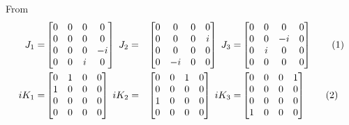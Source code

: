 \documentclass[]{article}
\newcommand\numberthis{\addtocounter{equation}{1}\tag{\theequation}}
\begin{document}
From \cite[II.3,(2,5,6)]{zee2010quantum}
\begin{align*}
	J_1 =& \begin{bmatrix}
		0&0&0&0\\
		0&0&0&0\\
		0&0&0&-i\\
		0&0&i&0\\
	\end{bmatrix}\;
	J_2 =& \begin{bmatrix}
		0&0&0&0\\
		0&0&0&i\\
		0&0&0&0\\
		0&-i&0&0\\
	\end{bmatrix}\;
	J_3 =& \begin{bmatrix}
		0&0&0&0\\
		0&0&-i&0\\
		0&i&0&0\\
		0&0&0&0\\
	\end{bmatrix} \numberthis \label{eq:Js}\\
	i K_1 =& \begin{bmatrix}
		0&1&0&0\\
		1&0&0&0\\
		0&0&0&0\\
		0&0&0&0\\
	\end{bmatrix}\;
	i K_2 =& \begin{bmatrix}
		0&0&1&0\\
		0&0&0&0\\
		1&0&0&0\\
		0&0&0&0\\
	\end{bmatrix}\;
	i K_3 =& \begin{bmatrix}
		0&0&0&1\\
		0&0&0&0\\
		0&0&0&0\\
		1&0&0&0\\
	\end{bmatrix} \numberthis \label{eq:Ks}
\end{align*}
\end{document}
